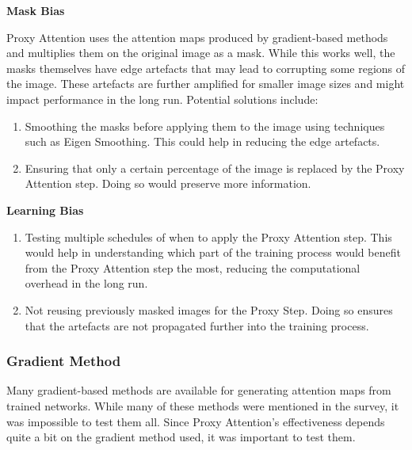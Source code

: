 \textbf{Mask Bias}

Proxy Attention uses the attention maps produced by gradient-based methods and multiplies them on the original image as a mask. While this works well, the masks themselves have edge artefacts that may lead to corrupting some regions of the image. These artefacts are further amplified for smaller image sizes and might impact performance in the long run.
Potential solutions include:

\begin{enumerate}
    \item Smoothing the masks before applying them to the image using techniques such as Eigen Smoothing. This could help in reducing the edge artefacts.
    \item Ensuring that only a certain percentage of the image is replaced by the Proxy Attention step. Doing so would preserve more information.
\end{enumerate}

\textbf{Learning Bias}
\begin{enumerate}
    \item Testing multiple schedules of when to apply the Proxy Attention step. This would help in understanding which part of the training process would benefit from the Proxy Attention step the most, reducing the computational overhead in the long run.
    \item Not reusing previously masked images for the Proxy Step. Doing so ensures that the artefacts are not propagated further into the training process.
\end{enumerate}


\subsubsection{Gradient Method}
Many gradient-based methods are available for generating attention maps from trained networks. While many of these methods were mentioned in the survey, it was impossible to test them all. Since Proxy Attention's effectiveness depends quite a bit on the gradient method used, it was important to test them.

